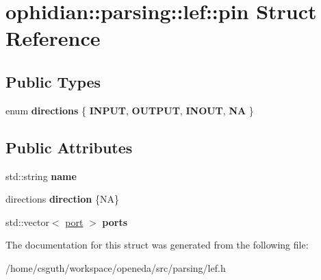 \hypertarget{structophidian_1_1parsing_1_1lef_1_1pin}{\section{ophidian\-:\-:parsing\-:\-:lef\-:\-:pin Struct Reference}
\label{structophidian_1_1parsing_1_1lef_1_1pin}
}
\subsection*{Public Types}
\begin{DoxyCompactItemize}
\item 
enum {\bfseries directions} \{ {\bfseries I\-N\-P\-U\-T}, 
{\bfseries O\-U\-T\-P\-U\-T}, 
{\bfseries I\-N\-O\-U\-T}, 
{\bfseries N\-A}
 \}
\end{DoxyCompactItemize}
\subsection*{Public Attributes}
\begin{DoxyCompactItemize}
\item 
\hypertarget{structophidian_1_1parsing_1_1lef_1_1pin_afa537fc8ddc9211e98a9511a4121b2e5}{std\-::string {\bfseries name}}\label{structophidian_1_1parsing_1_1lef_1_1pin_afa537fc8ddc9211e98a9511a4121b2e5}

\item 
\hypertarget{structophidian_1_1parsing_1_1lef_1_1pin_a71c8164853dcc7b162b634794fe74689}{directions {\bfseries direction} \{N\-A\}}\label{structophidian_1_1parsing_1_1lef_1_1pin_a71c8164853dcc7b162b634794fe74689}

\item 
\hypertarget{structophidian_1_1parsing_1_1lef_1_1pin_ae8ccfdfff2be04d9d7dc2bdce2c828fb}{std\-::vector$<$ \hyperlink{structophidian_1_1parsing_1_1lef_1_1port}{port} $>$ {\bfseries ports}}\label{structophidian_1_1parsing_1_1lef_1_1pin_ae8ccfdfff2be04d9d7dc2bdce2c828fb}

\end{DoxyCompactItemize}


The documentation for this struct was generated from the following file\-:\begin{DoxyCompactItemize}
\item 
/home/csguth/workspace/openeda/src/parsing/lef.\-h\end{DoxyCompactItemize}
